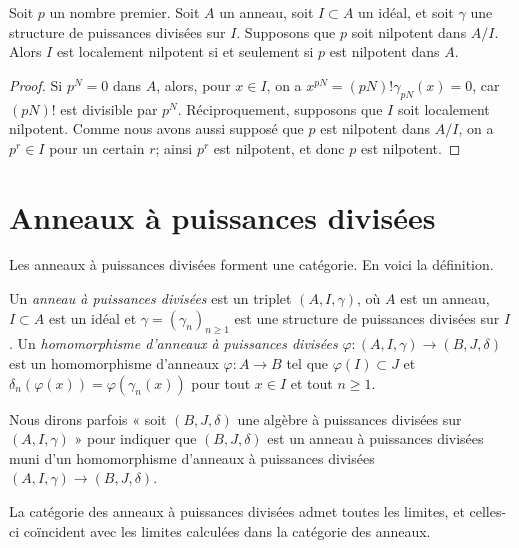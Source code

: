 \begin{lemma}
\label{lemma-nil}
Soit $p$ un nombre premier. Soit $A$ un anneau, soit $I \subset A$ un idéal,
et soit $\gamma$ une structure de puissances divisées sur $I$. Supposons que
$p$ soit nilpotent dans $A/I$. Alors $I$ est localement nilpotent si et
seulement si $p$ est nilpotent dans $A$.
\end{lemma}

\begin{proof}
Si $p^N = 0$ dans $A$, alors, pour $x \in I$, on a
$x^{pN} = (pN)!\gamma_{pN}(x) = 0$, car $(pN)!$ est divisible par $p^N$.
Réciproquement, supposons que $I$ soit localement nilpotent. Comme nous avons
aussi supposé que $p$ est nilpotent dans $A/I$, on a $p^r \in I$ pour un
certain $r$; ainsi $p^r$ est nilpotent, et donc $p$ est nilpotent.
\end{proof}



\section{Anneaux à puissances divisées}

\label{section-divided-power-rings}

\noindent
Les anneaux à puissances divisées forment une catégorie. En voici la définition.

\begin{definition}

\label{definition-divided-power-ring}
Un {\it anneau à puissances divisées} est un triplet $(A, I, \gamma)$, où $A$ est un anneau, $I \subset A$ est un idéal et $\gamma = (\gamma_n)_{n \geq 1}$ est une structure de puissances divisées sur $I$. Un {\it homomorphisme d'anneaux à puissances divisées} $\varphi : (A, I, \gamma) \to (B, J, \delta)$ est un homomorphisme d'anneaux $\varphi : A \to B$ tel que $\varphi(I) \subset J$ et $\delta_n(\varphi(x)) = \varphi(\gamma_n(x))$ pour tout $x \in I$ et tout $n \geq 1$.
\end{definition}

\noindent
Nous dirons parfois « soit $(B, J, \delta)$ une algèbre à puissances divisées sur $(A, I, \gamma)$ » pour indiquer que $(B, J, \delta)$ est un anneau à puissances divisées muni d'un homomorphisme d'anneaux à puissances divisées $(A, I, \gamma) \to (B, J, \delta)$.

\begin{lemma}

\label{lemma-limits}

La catégorie des anneaux à puissances divisées admet toutes les limites, et celles-ci coïncident avec les limites calculées dans la catégorie des anneaux.

\end{lemma}

